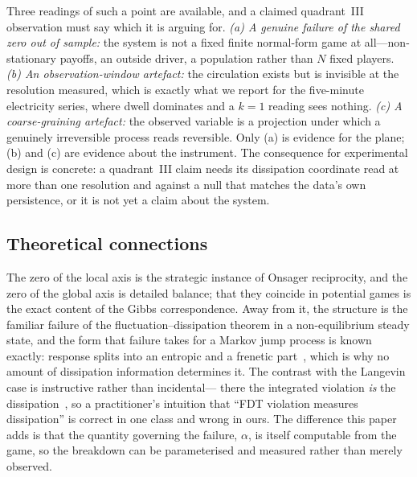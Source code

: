 Three readings of such a point are available, and a claimed quadrant~III observation must
say which it is arguing for. \emph{(a) A genuine failure of the shared zero out of sample:}
the system is not a fixed finite normal-form game at all---non-stationary payoffs, an
outside driver, a population rather than $N$ fixed players. \emph{(b) An
observation-window artefact:} the circulation exists but is invisible at the resolution
measured, which is exactly what we report for the five-minute electricity series, where
dwell dominates and a $k=1$ reading sees nothing. \emph{(c) A coarse-graining artefact:}
the observed variable is a projection under which a genuinely irreversible process reads
reversible. Only (a) is evidence for the plane; (b) and (c) are evidence about the
instrument. The consequence for experimental design is concrete: a quadrant~III claim needs
its dissipation coordinate read at more than one resolution and against a null that matches
the data's own persistence, or it is not yet a claim about the system.

\subsection{Theoretical connections}
The zero of the local axis is the strategic instance of Onsager reciprocity, and the zero of
the global axis is detailed balance; that they coincide in potential games is the exact
content of the Gibbs correspondence. Away from it, the structure is the familiar failure of
the fluctuation--dissipation theorem in a non-equilibrium steady state, and the form that
failure takes for a Markov jump process is known exactly: response splits into an entropic
and a frenetic part~\cite{baiesi2009}, which is why no amount of dissipation information
determines it. The contrast with the Langevin case is instructive rather than incidental---
there the integrated violation \emph{is} the dissipation~\cite{haradasasa2005}, so a
practitioner's intuition that ``FDT violation measures dissipation'' is correct in one class
and wrong in ours. The difference this paper adds is that the quantity governing the
failure, $\alpha$, is itself computable from the game, so the breakdown can be parameterised
and measured rather than merely observed.

